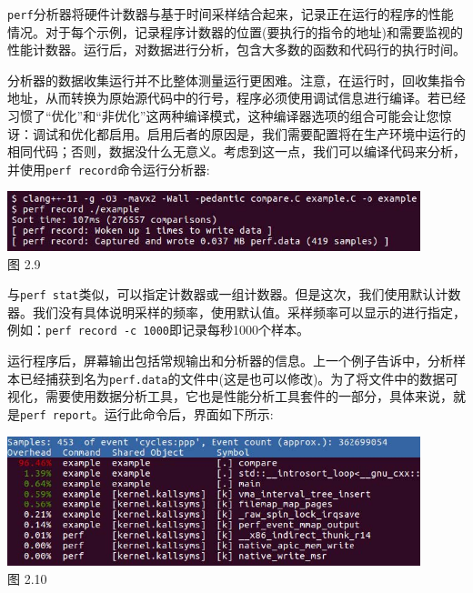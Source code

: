 
\texttt{perf}分析器将硬件计数器与基于时间采样结合起来，记录正在运行的程序的性能情况。对于每个示例，记录程序计数器的位置(要执行的指令的地址)和需要监视的性能计数器。运行后，对数据进行分析，包含大多数的函数和代码行的执行时间。

分析器的数据收集运行并不比整体测量运行更困难。注意，在运行时，回收集指令地址，从而转换为原始源代码中的行号，程序必须使用调试信息进行编译。若已经习惯了“优化”和“非优化”这两种编译模式，这种编译器选项的组合可能会让您惊讶：调试和优化都启用。启用后者的原因是，我们需要配置将在生产环境中运行的相同代码；否则，数据没什么无意义。考虑到这一点，我们可以编译代码来分析，并使用\texttt{perf record}命令运行分析器:

\begin{center}
\includegraphics[width=0.9\textwidth]{content/1/chapter2/images/9.jpg}\\
图 2.9
\end{center}

与\texttt{perf stat}类似，可以指定计数器或一组计数器。但是这次，我们使用默认计数器。我们没有具体说明采样的频率，使用默认值。采样频率可以显示的进行指定，例如：\texttt{perf record -c 1000}即记录每秒1000个样本。

运行程序后，屏幕输出包括常规输出和分析器的信息。上一个例子告诉中，分析样本已经捕获到名为\texttt{perf.data}的文件中(这是也可以修改)。为了将文件中的数据可视化，需要使用数据分析工具，它也是性能分析工具套件的一部分，具体来说，就是\texttt{perf report}。运行此命令后，界面如下所示:

\begin{center}
\includegraphics[width=0.9\textwidth]{content/1/chapter2/images/10.jpg}\\
图 2.10
\end{center}

